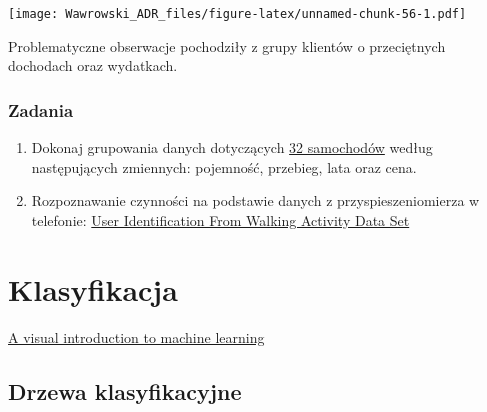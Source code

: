 \documentclass[]{book}
\newenvironment{Shaded}{\begin{snugshade}}{\end{snugshade}}
\newcommand{\DataTypeTok}[1]{\textcolor[rgb]{0.13,0.29,0.53}{#1}}
\newcommand{\KeywordTok}[1]{\textcolor[rgb]{0.13,0.29,0.53}{\textbf{#1}}}
\newcommand{\NormalTok}[1]{#1}
\newcommand{\OperatorTok}[1]{\textcolor[rgb]{0.81,0.36,0.00}{\textbf{#1}}}
\newcommand{\StringTok}[1]{\textcolor[rgb]{0.31,0.60,0.02}{#1}}
\begin{document}
\begin{Shaded}
\end{Shaded}

\texttt{[image: Wawrowski\_ADR\_files/figure-latex/unnamed-chunk-56-1.pdf]}

Problematyczne obserwacje pochodziły z grupy klientów o przeciętnych dochodach oraz wydatkach.

\hypertarget{zadania}{%
\subsection{Zadania}\label{zadania}}

\begin{enumerate}
\def\labelenumi{\arabic{enumi}.}
\item
  Dokonaj grupowania danych dotyczących \href{data/auta.csv}{32 samochodów} według następujących zmiennych: pojemność, przebieg, lata oraz cena.
\item
  Rozpoznawanie czynności na podstawie danych z przyspieszeniomierza w telefonie: \href{http://archive.ics.uci.edu/ml/datasets/User+Identification+From+Walking+Activity\#}{User Identification From Walking Activity Data Set}
\end{enumerate}

\hypertarget{klasyfikacja}{%
\chapter{Klasyfikacja}\label{klasyfikacja}}

\href{http://www.r2d3.us/visual-intro-to-machine-learning-part-1/}{A visual introduction to machine learning}

\hypertarget{drzewa-klasyfikacyjne}{%
\section{Drzewa klasyfikacyjne}\label{drzewa-klasyfikacyjne}}
\end{document}
